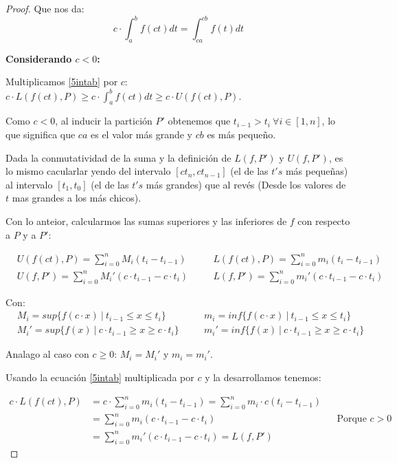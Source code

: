 \documentclass[12pt]{article}
\begin{document}
\begin{proof}
    Que nos da:
    \begin{equation*}
        c\cdot\int_{a}^{b}f(ct)dt=\int_{ca}^{cb}f(t)dt
    \end{equation*}

    \textbf{Considerando $c<0$:}\bigskip

    Multiplicamos \eqref{5intab} por $c$: \quad \(c\cdot L(f(ct),P)\geq c\cdot\int_{a}^{b}f(ct)dt\geq c\cdot U(f(ct),P)\).\bigskip

    Como $c<0$, al inducir la partici\'on $P'$ obtenemos que $t_{i-1}>t_i \ \forall i \in[1,n]$, lo que significa que $ca$ es el valor m\'as grande y $cb$ es m\'as pequeño.\bigskip

    Dada la conmutatividad de la suma y la definici\'on de $L(f,P')$ y $U(f,P')$, es lo mismo cacularlar yendo del intervalo $[ct_n,ct_{n-1}]$ (el de las $t's$ m\'as pequeñas) al intervalo $[t_1,t_0]$ (el de las $t's$ m\'as grandes) que al rev\'es (Desde los valores de $t$ mas grandes a los m\'as chicos).\bigskip

    Con lo anteior, calcularmos las sumas superiores y las inferiores de $f$ con respecto a $P$ y a $P'$:

    \begin{align*}
        &U(f(ct),P)=\sum_{i=0}^n M_i(t_i-t_{i-1}) \quad &&L(f(ct),P)=\sum_{i=0}^n m_i(t_i-t_{i-1})\\
        &U(f,P')=\sum_{i=0}^n M_i'(c\cdot t_{i-1}-c\cdot t_i) \quad &&L(f,P')=\sum_{i=0}^n m_i'(c\cdot t_{i-1}-c\cdot t_i)
    \end{align*}

    Con:
    \begin{align*}
        &M_i=sup\{f(c\cdot x) \ | \ t_{i-1}\leq x\leq t_i\} \quad &&m_i=inf\{f(c\cdot x) \ | \ t_{i-1}\leq x\leq t_i\}\\
        &M_i'=sup\{f(x) \ | \ c\cdot t_{i-1}\geq x\geq c\cdot t_i\} \quad &&m_i'=inf\{f(x) \ | \ c\cdot t_{i-1}\geq x\geq c\cdot t_i\}
    \end{align*}

    Analago al caso con $c\geq0$: $M_i=M_i'$ y $m_i=m_i'$.

    Usando la ecuaci\'on \eqref{5intab} multiplicada por $c$ y la desarrollamos tenemos:

    \begin{align*}
        c\cdot L(f(ct),P) &= c \cdot \sum_{i=0}^n m_i(t_i-t_{i-1}) = \sum_{i=0}^n m_i\cdot c(t_i-t_{i-1}) \\
        &= \sum_{i=0}^n m_i(c\cdot t_{i-1}-c\cdot t_i) \quad &&\text{Porque $c>0$}\\
        &= \sum_{i=0}^n m_i'(c\cdot t_{i-1}-c\cdot t_i) = L(f,P')
    \end{align*}


\end{proof}
\end{document}
